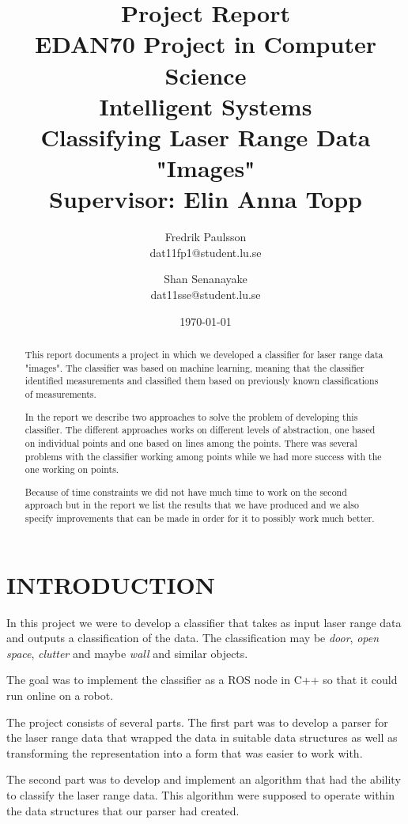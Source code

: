 \documentclass[a4paper, 10pt, conference]{ieeeconf}      %
\title{\LARGE \bf Project Report \\ EDAN70 Project in Computer Science \\ Intelligent Systems \\ Classifying Laser Range Data "Images" \\ Supervisor: Elin Anna Topp}
\date{\today}
\author{Fredrik Paulsson \\ dat11fp1@student.lu.se \and Shan Senanayake \\ dat11sse@student.lu.se}
\begin{document}
\maketitle
\thispagestyle{empty}
\pagestyle{empty}


\begin{abstract}
This report documents a project in which we developed a classifier for laser range data "images". The classifier was based on machine learning, meaning that the classifier identified measurements and classified them based on previously known classifications of measurements.

In the report we describe two approaches to solve the problem of developing this classifier. The different approaches works on different levels of abstraction, one based on individual points and one based on lines among the points. There was several problems with the classifier working among points while we had more success with the one working on points.

Because of time constraints we did not have much time to work on the second approach but in the report we list the results that we have produced and we also specify improvements that can be made in order for it to possibly work much better.


\end{abstract}


\section{INTRODUCTION}

In this project we were to develop a classifier that takes as input laser range data and outputs a classification of the data. The classification may be \emph{door}, \emph{open space}, \emph{clutter} and maybe \emph{wall} and similar objects.

The goal was to implement the classifier as a ROS node in C++ so that it could run online on a robot.

The project consists of several parts. The first part was to develop a parser for the laser range data that wrapped the data in suitable data structures as well as transforming the representation into a form that was easier to work with.

The second part was to develop and implement an algorithm that had the ability to classify the laser range data. This algorithm were supposed to operate within the data structures that our parser had created.
\end{document}
